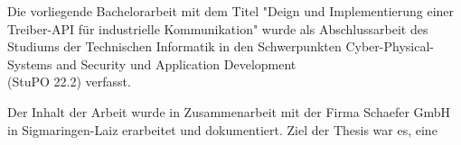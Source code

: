 Die vorliegende Bachelorarbeit mit dem Titel "Deign und Implementierung einer Treiber-API für industrielle Kommunikation" wurde als Abschlussarbeit des Studiums der Technischen Informatik in den Schwerpunkten Cyber-Physical-Systems and Security und Application Development\\ (StuPO 22.2) verfasst.

Der Inhalt der Arbeit wurde in Zusammenarbeit mit der Firma Schaefer GmbH in Sigmaringen-Laiz erarbeitet und dokumentiert.
Ziel der Thesis war es, eine 
